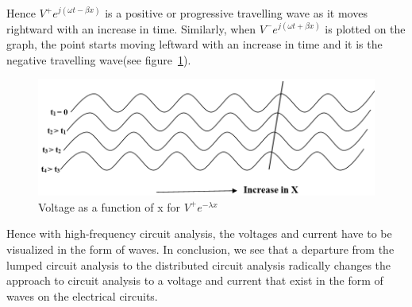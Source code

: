 Hence  $ V^{+}e^{j(\omega t- \beta x )} $ is a positive or progressive travelling wave as it moves rightward with an increase in time. Similarly, when $ V^{-}e^{j( \omega t+ \beta x )} $ is plotted on the graph, the point starts moving leftward with an increase in time and it is the negative travelling wave(see figure~\ref{fig:abcd}).
\begin{figure}[h]
\centering
\includegraphics[width=1\linewidth]{./graphics/ABCD}
\caption{Voltage as a function of x for $V^+e^{-\lambda x}$}
\label{fig:abcd}
\end{figure}

Hence with high-frequency circuit analysis, the voltages and current have to be visualized in the form of waves. In conclusion, we see that a departure from the lumped circuit analysis to the distributed circuit analysis radically changes the approach to circuit analysis to a voltage and current that exist in the form of waves on the electrical circuits. 

\newpage
